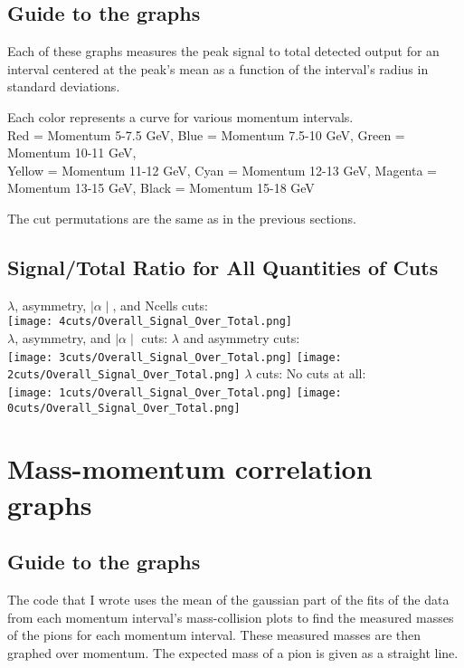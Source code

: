 \documentclass[11pt]{article}
\begin{document}
\subsection{Guide to the graphs} %
Each of these graphs measures the peak signal to total detected output for an interval centered at the peak's mean as a function of the interval's radius in standard deviations.

Each color represents a curve for various momentum intervals.\\
Red = Momentum 5-7.5 GeV, Blue = Momentum 7.5-10 GeV, Green = Momentum 10-11 GeV, \\
Yellow = Momentum 11-12 GeV, Cyan = Momentum 12-13 GeV, Magenta = Momentum 13-15 GeV, Black =  Momentum 15-18 GeV

The cut permutations are the same as in the previous sections.

\subsection{Signal/Total Ratio for All Quantities of Cuts} %
\begin{frame}{}
$\lambda$, asymmetry, $\mid\alpha\mid$, and Ncells cuts:\\
\texttt{[image: 4cuts/Overall\_Signal\_Over\_Total.png]}\\
$\lambda$, asymmetry, and $\mid\alpha\mid$ cuts:
\noindent\hspace{3 cm}$\lambda$ and asymmetry cuts:\\
\texttt{[image: 3cuts/Overall\_Signal\_Over\_Total.png]}
\texttt{[image: 2cuts/Overall\_Signal\_Over\_Total.png]}
$\lambda$ cuts:
\noindent\hspace{4 cm} No cuts at all:\\
\texttt{[image: 1cuts/Overall\_Signal\_Over\_Total.png]}
\texttt{[image: 0cuts/Overall\_Signal\_Over\_Total.png]}
\end{frame}

\section{Mass-momentum correlation graphs} 
\subsection{Guide to the graphs} %
The code that I wrote uses the mean of the gaussian part of the fits of the data from each momentum interval's mass-collision plots to find the measured masses of the pions for each momentum interval. These measured masses are then graphed over momentum. The expected mass of a pion is given as a straight line.
\end{document}

